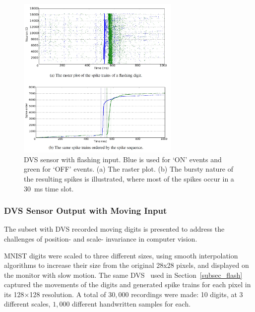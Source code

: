 \documentclass{frontiersENG} %
\begin{document}
\begin{figure}[b!]
	\centering
	\includegraphics[width=0.7\textwidth]{fig5}	
	\caption{DVS sensor with flashing input.
	Blue is used for `ON' events and green for `OFF' events.
	(a) The raster plot.
	(b) The bursty nature of the resulting spikes is illustrated, where most of the spikes occur in a 30~ms time slot.}
	\label{fig:flash}
\end{figure}

\subsubsection{DVS Sensor Output with Moving Input}

The subset with DVS recorded moving digits is presented to address the challenges of position- and scale- invariance in computer vision.

MNIST digits were scaled to three different sizes, using smooth interpolation algorithms to increase their size from the original 28x28 pixels, and displayed on the monitor with slow motion. 
The same DVS~\citep{serrano2013128} used in Section~\ref{subsec_flash} captured the movements of the digits and generated spike trains for each pixel in its 128$\times$128 resolution.
A total of $30,000$ recordings were made: 10 digits, at 3 different scales, $1,000$ different handwritten samples for each.
\end{document}
